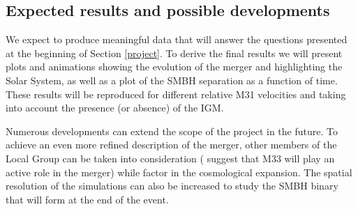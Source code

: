 \documentclass[10pt,english]{article}
\begin{document}
\subsection{Expected results and possible developments}
\label{expected-results}
We expect to produce meaningful data that will answer the questions presented at the beginning of Section \ref{project}. To derive the final results we will present plots and animations showing the evolution of the merger and highlighting the Solar System, as well as a plot of the SMBH separation as a function of time. These results will be reproduced for different relative M31 velocities and taking into account the presence (or absence) of the IGM.\par
\smallskip
Numerous developments can extend the scope of the project in the future. To achieve an even more refined description of the merger, other members of the Local Group can be taken into consideration (\textcite{van_der_Marel_2012b} suggest that M33 will play an active role in the merger) while factor in the cosmological expansion. The spatial resolution of the simulations can also be increased to study the SMBH binary that will form at the end of the event.\par

\setlength{}
\printbibliography[heading=bibintoc,title={References}]
\end{document}
